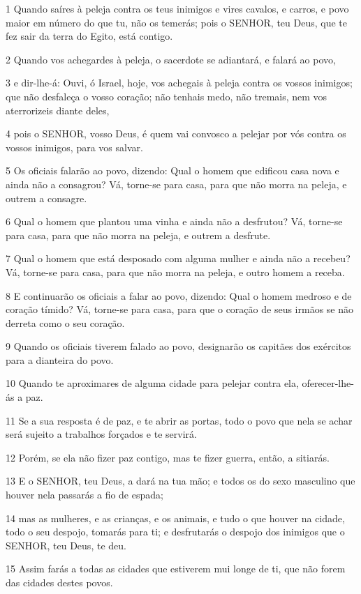 \par 1 Quando saíres à peleja contra os teus inimigos e vires cavalos, e carros, e povo maior em número do que tu, não os temerás; pois o SENHOR, teu Deus, que te fez sair da terra do Egito, está contigo.
\par 2 Quando vos achegardes à peleja, o sacerdote se adiantará, e falará ao povo,
\par 3 e dir-lhe-á: Ouvi, ó Israel, hoje, vos achegais à peleja contra os vossos inimigos; que não desfaleça o vosso coração; não tenhais medo, não tremais, nem vos aterrorizeis diante deles,
\par 4 pois o SENHOR, vosso Deus, é quem vai convosco a pelejar por vós contra os vossos inimigos, para vos salvar.
\par 5 Os oficiais falarão ao povo, dizendo: Qual o homem que edificou casa nova e ainda não a consagrou? Vá, torne-se para casa, para que não morra na peleja, e outrem a consagre.
\par 6 Qual o homem que plantou uma vinha e ainda não a desfrutou? Vá, torne-se para casa, para que não morra na peleja, e outrem a desfrute.
\par 7 Qual o homem que está desposado com alguma mulher e ainda não a recebeu? Vá, torne-se para casa, para que não morra na peleja, e outro homem a receba.
\par 8 E continuarão os oficiais a falar ao povo, dizendo: Qual o homem medroso e de coração tímido? Vá, torne-se para casa, para que o coração de seus irmãos se não derreta como o seu coração.
\par 9 Quando os oficiais tiverem falado ao povo, designarão os capitães dos exércitos para a dianteira do povo.
\par 10 Quando te aproximares de alguma cidade para pelejar contra ela, oferecer-lhe-ás a paz.
\par 11 Se a sua resposta é de paz, e te abrir as portas, todo o povo que nela se achar será sujeito a trabalhos forçados e te servirá.
\par 12 Porém, se ela não fizer paz contigo, mas te fizer guerra, então, a sitiarás.
\par 13 E o SENHOR, teu Deus, a dará na tua mão; e todos os do sexo masculino que houver nela passarás a fio de espada;
\par 14 mas as mulheres, e as crianças, e os animais, e tudo o que houver na cidade, todo o seu despojo, tomarás para ti; e desfrutarás o despojo dos inimigos que o SENHOR, teu Deus, te deu.
\par 15 Assim farás a todas as cidades que estiverem mui longe de ti, que não forem das cidades destes povos.
